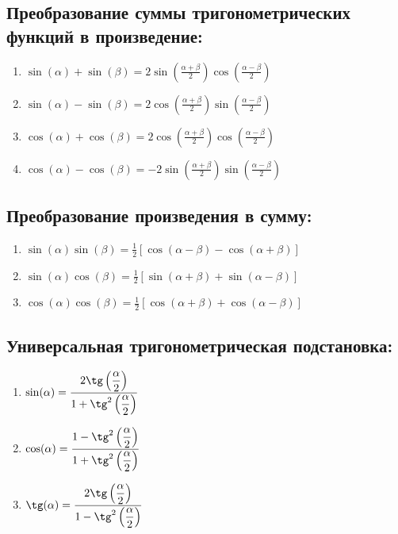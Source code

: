 \documentclass[12pt, a4paper]{article}
\begin{document}
\subsection{Преобразование суммы тригонометрических функций в произведение:}
\begin{enumerate}
	\item $ \sin(\alpha)+\sin(\beta) =\displaystyle   2\sin\left(\frac{\alpha+\beta}{2}\right)\cos\left(\frac{\alpha-\beta}{2}\right) $ \\
	\item $ \sin(\alpha)-\sin(\beta) =\displaystyle   2\cos\left(\frac{\alpha+\beta}{2}\right)\sin\left(\frac{\alpha-\beta}{2}\right) $ \\
	\item $ \cos(\alpha)+\cos(\beta) =\displaystyle   2\cos\left(\frac{\alpha+\beta}{2}\right)\cos\left(\frac{\alpha-\beta}{2}\right) $ \\
	\item $ \cos(\alpha)-\cos(\beta) =\displaystyle  -2\sin\left(\frac{\alpha+\beta}{2}\right)\sin\left(\frac{\alpha-\beta}{2}\right) $ \\
\end{enumerate}
\subsection{Преобразование произведения в сумму:}
\begin{enumerate}
	\item $ \sin(\alpha)\sin(\beta) =\displaystyle  \frac{1}{2} [\cos(\alpha-\beta) - \cos(\alpha+\beta)]$ \\
	\item $ \sin(\alpha)\cos(\beta) =\displaystyle  \frac{1}{2} [\sin(\alpha+\beta) + \sin(\alpha-\beta)]$ \\
	\item $ \cos(\alpha)\cos(\beta) =\displaystyle  \frac{1}{2} [\cos(\alpha+\beta) + \cos(\alpha-\beta)]$ \\
\end{enumerate}
\subsection{Универсальная тригонометрическая подстановка:}
\begin{enumerate}
	\item $ \sin(\alpha) =\displaystyle \frac{2\tg\left(\displaystyle\frac{\alpha}{2}\right)}{1+\tg^2\left(\displaystyle\frac{\alpha}{2}\right)}$
	\item $ \cos(\alpha) =\displaystyle \frac{1-\tg^2\left(\displaystyle\frac{\alpha}{2}\right)}{1+\tg^2\left(\displaystyle\frac{\alpha}{2}\right)}$ 
	\item $ \tg(\alpha)  =\displaystyle \frac{2\tg\left(\displaystyle\frac{\alpha}{2}\right)}{1-\tg^2\left(\displaystyle\frac{\alpha}{2}\right)}$
\end{enumerate}
\end{document}
